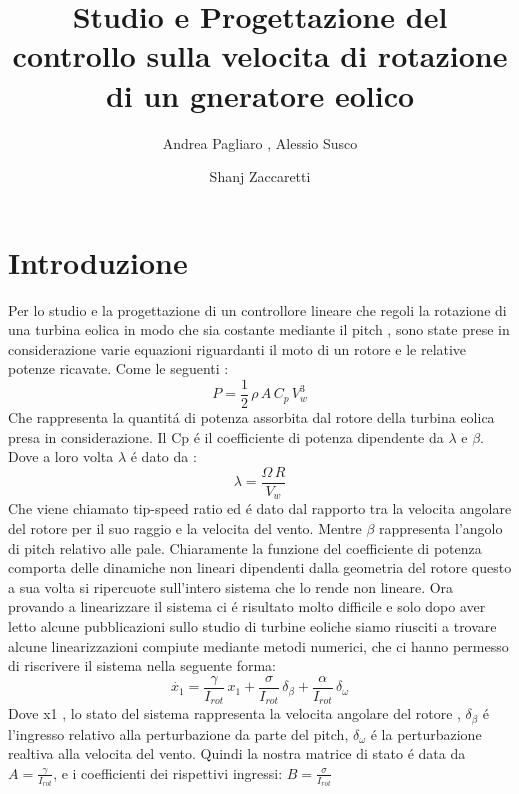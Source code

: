 \documentclass[a4paper,13pt]{article}
\begin{document}
\author{Andrea Pagliaro , Alessio Susco \and Shanj Zaccaretti}
\title{Studio e Progettazione del controllo sulla velocita di rotazione di un gneratore eolico}
\maketitle
\section{Introduzione}
Per lo studio e la progettazione di un controllore lineare che regoli la rotazione di una turbina eolica in modo che sia costante mediante il pitch , sono state prese in considerazione varie equazioni riguardanti il moto di un rotore e le relative potenze ricavate.
Come le seguenti :
\begin{equation}
P=\frac{1}{2}\,\rho\,A\,C_p\,V_w^3
\end{equation}
Che rappresenta la quantit\'a di potenza assorbita dal rotore della turbina eolica presa in considerazione.
Il Cp \'e il coefficiente di potenza dipendente da $\lambda$ e $\beta$.
Dove a loro volta $\lambda$ \'e dato da :
\begin{equation}
\lambda=\frac{\Omega\,R}{V_w}
\end{equation}
Che viene chiamato tip-speed ratio ed \'e dato dal rapporto tra la velocita angolare
del rotore per il suo raggio e la velocita del vento.
Mentre $\beta$ rappresenta l'angolo di pitch relativo alle pale.
Chiaramente la funzione del coefficiente di potenza comporta delle dinamiche non 
lineari dipendenti dalla geometria del rotore questo a sua volta si ripercuote sull'intero sistema che lo rende non lineare.  
Ora provando a linearizzare il sistema ci \'e risultato molto difficile e solo dopo aver letto alcune pubblicazioni sullo studio di turbine eoliche siamo riusciti a trovare alcune linearizzazioni compiute mediante metodi numerici, che ci hanno permesso di riscrivere il sistema nella seguente forma:
\begin{equation}
\dot{x_1}=\frac{\gamma}{I_{rot}}\,x_1+\frac{\sigma}{I_{rot}}\,\delta_\beta+\frac{\alpha}{I_{rot}}\,\delta_\omega
\end{equation}
Dove x1 , lo stato del sistema rappresenta la velocita angolare del rotore ,
$\delta_\beta$ \'e l'ingresso relativo alla perturbazione da parte del pitch,
$\delta_\omega$ \'e la perturbazione realtiva alla velocita del vento.
Quindi la nostra matrice di stato \'e data da $A=\frac{\gamma}{I_{rot}}$,
e i coefficienti dei rispettivi ingressi:
$B=\frac{\sigma}{I_{rot}}$
\end{document}
